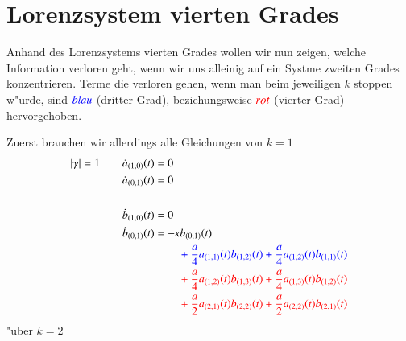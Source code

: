 \section{Lorenzsystem vierten Grades\label{section:lorenz2:4degreelorenz}}
Anhand des Lorenzsystems vierten Grades wollen wir nun zeigen, welche 
Information verloren geht, wenn wir uns alleinig auf ein Systme zweiten Grades 
konzentrieren.
Terme die verloren gehen, wenn man beim jeweiligen $k$ stoppen w"urde, sind 
$\color{blue}{blau}$ (dritter Grad), beziehungsweise $\color{red}{rot}$ 
(vierter Grad) hervorgehoben.

Zuerst brauchen wir allerdings alle Gleichungen von $k = 1$
\begin{align*}
|\gamma| = 1
\qquad &
\dot{a}_{(1,0)}(t) = 0
\\
&
\dot{a}_{(0,1)}(t) = 0
\\
\\
&
\dot{b}_{(1,0)}(t) = 0
\\
&
\dot{b}_{(0,1)}(t)
=
-
\kappa
b_{(0,1)}(t)
\\
&\phantom{aaaaaaaaaa}
\color{blue}
+
\frac{a}{4} a_{(1,1)}(t) b_{(1,2)}(t)
+
\frac{a}{4} a_{(1,2)}(t) b_{(1,1)}(t)
\\
&\phantom{aaaaaaaaaa}
\color{red}
+
\frac{a}{4} a_{(1,2)}(t) b_{(1,3)}(t)
+
\frac{a}{4} a_{(1,3)}(t) b_{(1,2)}(t)
\\
&\phantom{aaaaaaaaaa}
\color{red}
+
\frac{a}{2} a_{(2,1)}(t) b_{(2,2)}(t)
+
\frac{a}{2} a_{(2,2)}(t) b_{(2,1)}(t)
\end{align*}
"uber $k = 2$

